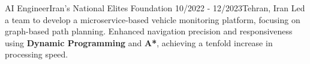 \resumeSubheadingReza
{AI Engineer}{Iran's National Elites Foundation}
{10/2022 - 12/2023}{Tehran, Iran}
{Led a team to develop a microservice-based vehicle monitoring platform, focusing on graph-based path planning. Enhanced navigation precision and responsiveness using \textbf{Dynamic Programming} and \textbf{A*}, achieving a tenfold increase in processing speed.}